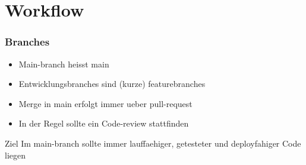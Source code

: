 \section{Workflow}
\begin{frame}
    \frametitle{Branches}
    \begin{itemize}
    \item Main-branch heisst main
    \item Entwicklungsbranches sind (kurze) featurebranches
    \item Merge in main erfolgt immer ueber pull-request
    \item In der Regel sollte ein Code-review stattfinden
    \end{itemize}
    \begin{block}{Ziel}
      Im main-branch sollte immer lauffaehiger, getesteter und deployfahiger Code liegen
      \end{block}
  \end{frame}